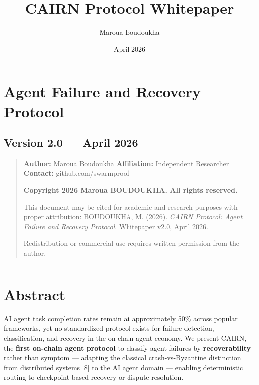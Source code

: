 \documentclass[
  10pt,
]{article}
\title{CAIRN Protocol Whitepaper}
\author{Maroua Boudoukha}
\date{April 2026}
\begin{document}
\maketitle

{
\hypersetup{linkcolor=}
\setcounter{tocdepth}{3}
\tableofcontents
}
\hypertarget{agent-failure-and-recovery-protocol}{%
\section{Agent Failure and Recovery
Protocol}\label{agent-failure-and-recovery-protocol}}

\hypertarget{version-2.0-april-2026}{%
\subsection{Version 2.0 --- April 2026}\label{version-2.0-april-2026}}

\begin{quote}
\textbf{Author:} Maroua Boudoukha \textbf{Affiliation:} Independent
Researcher \textbf{Contact:} github.com/swarmproof

\textbf{Copyright 2026 Maroua BOUDOUKHA. All rights reserved.}

This document may be cited for academic and research purposes with
proper attribution: BOUDOUKHA, M. (2026). \emph{CAIRN Protocol: Agent
Failure and Recovery Protocol}. Whitepaper v2.0, April 2026.

Redistribution or commercial use requires written permission from the
author.
\end{quote}

\begin{center}\rule{0.5\linewidth}{0.5pt}\end{center}

\hypertarget{abstract}{%
\section{Abstract}\label{abstract}}

AI agent task completion rates remain at approximately 50\% across
popular frameworks, yet no standardized protocol exists for failure
detection, classification, and recovery in the on-chain agent economy.
We present CAIRN, the \textbf{first on-chain agent protocol} to classify
agent failures by \textbf{recoverability} rather than symptom ---
adapting the classical crash-vs-Byzantine distinction from distributed
systems {[}8{]} to the AI agent domain --- enabling deterministic
routing to checkpoint-based recovery or dispute resolution.
\end{document}
